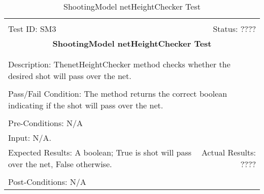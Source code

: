 \documentclass[11pt]{article}
\begin{document}
\begin{center}
\begin{table}[H]
\begin{tabular}{|l r|}\hline&\\[-2mm]
	Test ID: SM3	&Status: ????\\[-3mm]
	\multicolumn{2}{|c|}{\textbf{\large{ShootingModel netHeightChecker Test}}}\\&\\\hline&\\[-3mm]
	\multicolumn{2}{|p{\textwidth}|}{Description: ThenetHeightChecker method checks whether the desired shot will pass over the net.}\\[1mm]\hline&\\[-3mm]
	\multicolumn{2}{|p{\textwidth}|}{Pass/Fail Condition: The method returns the correct boolean indicating if the shot will pass over the net.}\\[1mm]\hline&\\[-3mm]
	\multicolumn{2}{|p{\textwidth}|}{Pre-Conditions: N/A}\\[4mm]
	\multicolumn{2}{|p{\textwidth}|}{Input: N/A.}\\[2mm]\hline
	\multicolumn{1}{|p{0.49\textwidth}}{Expected Results: A boolean; True is shot will pass over the net, False otherwise.}	&\multicolumn{1}{|p{0.45\textwidth}|}{Actual Results: ????}\\\hline&\\[-3mm]
	\multicolumn{2}{|p{\textwidth}|}{Post-Conditions: N/A}\\\hline
\end{tabular}
\caption{ShootingModel netHeightChecker Test}
\end{table}
\end{center}
\end{document}
